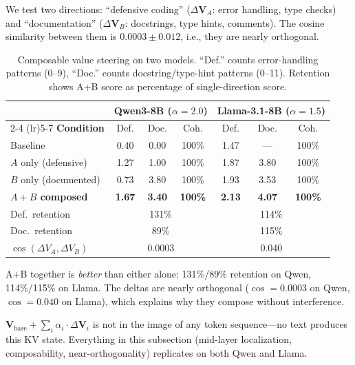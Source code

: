 \documentclass{article}
\begin{document}
We test two directions: ``defensive coding'' ($\Delta \mathbf{V}_A$: error handling, type checks) and ``documentation'' ($\Delta \mathbf{V}_B$: docstrings, type hints, comments). The cosine similarity between them is $0.0003 \pm 0.012$, i.e., they are nearly orthogonal.

\begin{table}[t]
\centering
\caption{Composable value steering on two models. ``Def.'' counts error-handling patterns (0--9), ``Doc.'' counts docstring/type-hint patterns (0--11). Retention shows A+B score as percentage of single-direction score.}
\label{tab:compose}
\begin{tabular}{lcccccc}
\toprule
 & \multicolumn{3}{c}{\textbf{Qwen3-8B} ($\alpha{=}2.0$)} & \multicolumn{3}{c}{\textbf{Llama-3.1-8B} ($\alpha{=}1.5$)} \\
\cmidrule(lr){2-4} \cmidrule(lr){5-7}
\textbf{Condition} & Def. & Doc. & Coh. & Def. & Doc. & Coh. \\
\midrule
Baseline & 0.40 & 0.00 & 100\% & 1.47 & --- & 100\% \\
\midrule
$A$ only (defensive) & 1.27 & 1.00 & 100\% & 1.87 & 3.80 & 100\% \\
$B$ only (documented) & 0.73 & 3.80 & 100\% & 1.93 & 3.53 & 100\% \\
\textbf{$A{+}B$ composed} & \textbf{1.67} & \textbf{3.40} & \textbf{100\%} & \textbf{2.13} & \textbf{4.07} & \textbf{100\%} \\
\midrule
Def.\ retention & \multicolumn{3}{c}{131\%} & \multicolumn{3}{c}{114\%} \\
Doc.\ retention & \multicolumn{3}{c}{89\%} & \multicolumn{3}{c}{115\%} \\
\midrule
$\cos(\Delta V_A, \Delta V_B)$ & \multicolumn{3}{c}{0.0003} & \multicolumn{3}{c}{0.040} \\
\bottomrule
\end{tabular}
\end{table}

A+B together is \textit{better} than either alone: 131\%/89\% retention on Qwen, 114\%/115\% on Llama. The deltas are nearly orthogonal ($\cos{=}0.0003$ on Qwen, $\cos{=}0.040$ on Llama), which explains why they compose without interference.

$\mathbf{V}_{\text{base}} + \sum_i \alpha_i \cdot \Delta \mathbf{V}_i$ is not in the image of any token sequence---no text produces this KV state. Everything in this subsection (mid-layer localization, composability, near-orthogonality) replicates on both Qwen and Llama.
\end{document}
